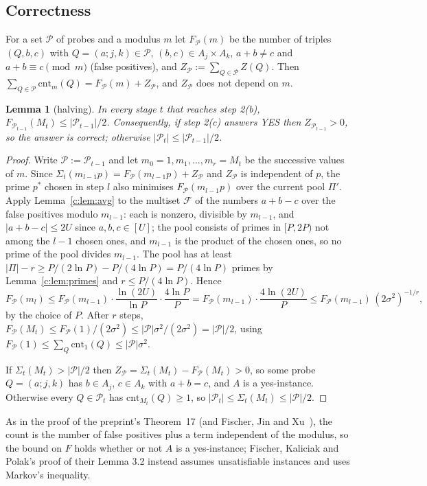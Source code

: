 \documentclass[11pt]{article}
\newtheorem{lemma}[theorem]{Lemma}
\theoremstyle{definition}
\theoremstyle{remark}
\newcommand{\cnt}{\mathrm{cnt}}
\newcommand{\Pq}{\mathcal{P}}
\begin{document}
\subsection{Correctness}\label{s:sec:correctness}

For a set $\Pq$ of probes and a modulus $m$ let $F_\Pq(m)$ be the number of triples $(Q,b,c)$ with $Q=(a;j,k)\in\Pq$, $(b,c)\in A_j\times A_k$, $a+b\ne c$ and $a+b\equiv c\pmod m$ (false positives), and $Z_\Pq:=\sum_{Q\in\Pq}Z(Q)$. Then $\sum_{Q\in\Pq}\cnt_m(Q)=F_\Pq(m)+Z_\Pq$, and $Z_\Pq$ does not depend on $m$.

\begin{lemma}[halving]\label{s:lem:halving}
In every stage $t$ that reaches step 2(b), $F_{\Pq_{t-1}}(M_t)\le|\Pq_{t-1}|/2$. Consequently, if step 2(c) answers YES then $Z_{\Pq_{t-1}}>0$, so the answer is correct; otherwise $|\Pq_t|\le|\Pq_{t-1}|/2$.
\end{lemma}
\begin{proof}
Write $\Pq:=\Pq_{t-1}$ and let $m_0=1,m_1,\dots,m_r=M_t$ be the successive values of $m$. Since $\Sigma_t(m_{l-1}p)=F_\Pq(m_{l-1}p)+Z_\Pq$ and $Z_\Pq$ is independent of $p$, the prime $p^*$ chosen in step $l$ also minimises $F_\Pq(m_{l-1}p)$ over the current pool $\Pi'$. Apply Lemma~\ref{c:lem:avg} to the multiset $\mathcal F$ of the numbers $a+b-c$ over the false positives modulo $m_{l-1}$: each is nonzero, divisible by $m_{l-1}$, and $|a+b-c|\le2U$ since $a,b,c\in[U]$; the pool consists of primes in $[P,2P)$ not among the $l-1$ chosen ones, and $m_{l-1}$ is the product of the chosen ones, so no prime of the pool divides $m_{l-1}$. The pool has at least $|\Pi|-r\ge P/(2\ln P)-P/(4\ln P)=P/(4\ln P)$ primes by Lemma~\ref{c:lem:primes} and $r\le P/(4\ln P)$. Hence
\[
F_\Pq(m_l)\le F_\Pq(m_{l-1})\cdot\frac{\ln(2U)}{\ln P}\cdot\frac{4\ln P}{P}=F_\Pq(m_{l-1})\cdot\frac{4\ln(2U)}{P}\le F_\Pq(m_{l-1})\,(2\sigma^2)^{-1/r},
\]
by the choice of $P$. After $r$ steps, $F_\Pq(M_t)\le F_\Pq(1)/(2\sigma^2)\le|\Pq|\sigma^2/(2\sigma^2)=|\Pq|/2$, using $F_\Pq(1)\le\sum_{Q}\cnt_1(Q)\le|\Pq|\sigma^2$.

If $\Sigma_t(M_t)>|\Pq|/2$ then $Z_\Pq=\Sigma_t(M_t)-F_\Pq(M_t)>0$, so some probe $Q=(a;j,k)$ has $b\in A_j$, $c\in A_k$ with $a+b=c$, and $A$ is a yes-instance. Otherwise every $Q\in\Pq_t$ has $\cnt_{M_t}(Q)\ge1$, so $|\Pq_t|\le \Sigma_t(M_t)\le|\Pq|/2$.
\end{proof}
As in the proof of the preprint's Theorem~17 (and Fischer, Jin and Xu~\cite[Lemma~3.2]{FJX25}), the count is the number of false positives plus a term independent of the modulus, so the bound on $F$ holds whether or not $A$ is a yes-instance; Fischer, Kaliciak and Polak's proof of their Lemma 3.2 instead assumes unsatisfiable instances and uses Markov's inequality.
\end{document}
